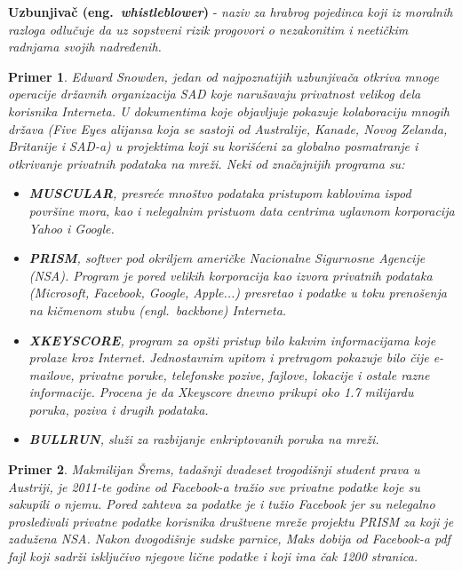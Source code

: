 \documentclass[a4paper]{article}
\newtheorem{primer}{Primer}[section]
\begin{document}
\textbf{Uzbunjivač (eng.~{\em whistleblower})} - \textit{naziv za hrabrog pojedinca koji iz moralnih razloga odlučuje da uz sopstveni rizik progovori o nezakonitim i neetičkim radnjama svojih nadređenih.} \cite{?}

\begin{primer}
	Edward Snowden, jedan od najpoznatijih uzbunjivača otkriva mnoge operacije državnih organizacija SAD koje narušavaju privatnost velikog dela korisnika Interneta. U dokumentima koje objavljuje pokazuje kolaboraciju mnogih država (Five Eyes alijansa koja se sastoji od Australije, Kanade, Novog Zelanda, Britanije i SAD-a\cite{?}) u projektima koji su korišćeni za globalno posmatranje i otkrivanje privatnih podataka na mreži. Neki od značajnijih programa su: \cite{?}
\begin{itemize}
	\item \textbf{MUSCULAR}, presreće mnoštvo podataka pristupom kablovima ispod površine mora, kao i nelegalnim pristuom data centrima uglavnom korporacija Yahoo i Google. \cite{?}
	\item \textbf{PRISM}, softver pod okriljem američke Nacionalne Sigurnosne Agencije (NSA). Program je pored velikih korporacija kao izvora privatnih podataka (Microsoft, Facebook, Google, Apple...) presretao i podatke u toku prenošenja na kičmenom stubu (engl.~{\em backbone}) Interneta. \cite{?}
	\item \textbf{XKEYSCORE}, program za opšti pristup bilo kakvim informacijama koje prolaze kroz Internet. Jednostavnim upitom i pretragom pokazuje bilo čije e-mailove, privatne poruke, telefonske pozive, fajlove, lokacije i ostale razne informacije. Procena je da Xkeyscore dnevno prikupi oko 1.7 milijardu poruka, poziva i drugih podataka. \cite{?}
	\item \textbf{BULLRUN}, služi za razbijanje enkriptovanih poruka na mreži. \cite{?}
\end{itemize}
\end{primer}

\begin{primer}
	Makmilijan Šrems, tadašnji dvadeset trogodišnji student prava u
Austriji, je 2011-te godine od Facebook-a tražio sve privatne podatke koje su sakupili o njemu. Pored zahteva za podatke je i tužio Facebook jer su nelegalno prosleđivali privatne podatke korisnika društvene mreže projektu PRISM\cite{?} za koji je zadužena NSA. Nakon dvogodišnje sudske parnice, Maks dobija od Facebook-a pdf fajl koji sadrži isključivo njegove lične podatke i koji ima čak 1200 stranica. \cite{?}
\end{primer}
\end{document}
